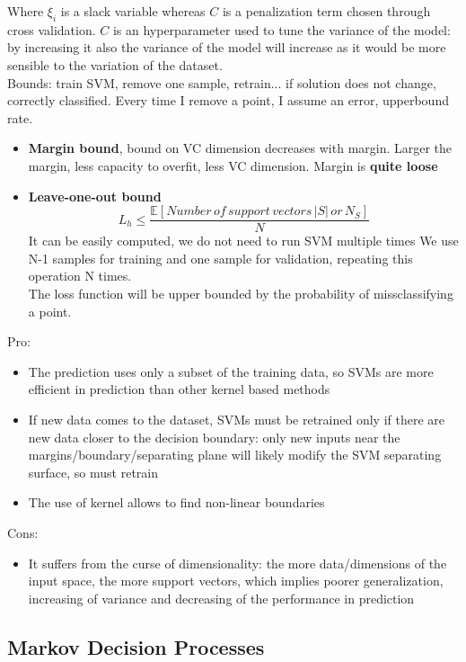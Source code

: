     Where $\xi_i$ is a slack variable whereas $C$ is a penalization term chosen through cross validation. $C$ is an hyperparameter used to tune the variance of the model: by increasing it also the variance of the model will increase as it would be more sensible to the variation of the dataset.\\
    Bounds: train SVM, remove one sample, retrain... if solution does not change, correctly classified. Every time I remove a point, I assume an error, upperbound rate.
    \begin{itemize}
        \item \textbf{Margin bound}, bound on VC dimension decreases with margin. Larger the margin, less capacity to overfit, less VC dimension. Margin is \textbf{quite loose}
        \item \textbf{Leave-one-out bound}
        $$L_h\leq\frac{\mathbb{E}[Number\,of\,support\,vectors\,|S|\,or\,N_S]}{N}$$
        It can be easily computed, we do not need to run SVM multiple times
        We use N-1 samples for training and one sample for validation, repeating this operation N times.\\
        The loss function will be upper bounded by the probability of missclassifying a point.
    \end{itemize}
    Pro:
    \begin{itemize}
        \item The prediction uses only a subset of the training data, so SVMs are more efficient in prediction than other kernel based methods
        \item If new data comes to the dataset, SVMs must be retrained only if there are new data closer to the decision boundary: only new inputs near the margins/boundary/separating plane will likely modify the SVM separating surface, so must retrain
        \item The use of kernel allows to find non-linear boundaries
    \end{itemize}
    Cons:
    \begin{itemize}
        \item  It suffers from the curse of dimensionality: the more data/dimensions of the input space, the more support vectors, which implies poorer generalization, increasing of variance and decreasing of the performance in prediction
    \end{itemize}

\subsection{Markov Decision Processes}

